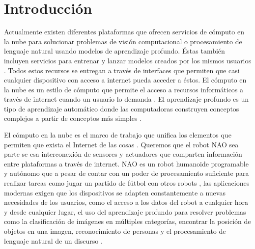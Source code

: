

\chapter*{Introducción}
\label{\detokenize{introduction:cloudnao-una-arquitectura-de-software-para-la-integracion-de-computo-en-la-nube-con-robots-nao}}\label{\detokenize{introduction:introduccion}}\label{\detokenize{introduction::doc}}


Actualmente existen diferentes plataformas que 
ofrecen servicios
de cómputo en la nube para solucionar problemas de 
visión computacional \cite{googlevision2018} o
procesamiento de lenguaje natural \cite{witaidocs2018} usando modelos
de aprendizaje profundo. Éstas también incluyen servicios 
para entrenar y lanzar
modelos creados por los mismos usuarios \cite{tensorflowgooglecloud2018}.
Todos estos recursos se entregan a través de 
interfaces que
permiten que casi cualquier dispositivo con acceso a 
internet
pueda acceder a éstos.
El cómputo en la nube es un estilo de cómputo que 
permite el acceso a 
recursos informáticos a través de internet cuando un
usuario lo demanda \cite{borkofurhtarmandoescalante2010}. El aprendizaje profundo es un 
tipo
de aprendizaje automático donde las computadoras 
construyen
conceptos complejos a partir de conceptos más 
simples \cite{iangoodfellowyoshuabengioaaroncourville2017}.


El cómputo en la nube es el marco de trabajo que
unifica los elementos que permiten que exista el
Internet de las cosas \cite{jayavardhanagubbiarajkumarbuyyabslavenmarusicamarimuthupalaniswamia2013}. Queremos que el robot NAO 
sea parte se esa interconexión de sensores y actuadores
que comparten información entre plataformas
a través de internet.
NAO es un robot humanoide programable y autónomo
que a pesar de contar con
un poder de procesamiento suficiente para realizar 
tareas como
jugar un partido de fútbol con otros robots \cite{splinfo2018},
las aplicaciones modernas
exigen que los dispositivos se adapten constantemente a nuevas necesidades
de los usuarios, como el acceso a los datos
del robot a cualquier hora y desde cualquier lugar, el uso del aprendizaje profundo para resolver problemas como la 
clasificación de imágenes en múltiples categorías, encontrar
la posición de objetos en una imagen, reconocimiento
de personas y el 
procesamiento de lenguaje natural de un discurso \cite{benkehoesachinpatilpieterabbeelkengoldberg2014}.

